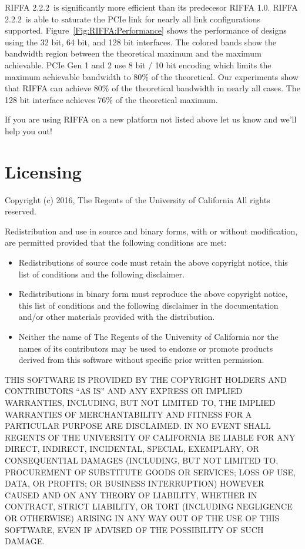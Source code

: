 \documentclass{refrep}
\newcommand{\RIFFAVer}{2.2.2}
\begin{document}
RIFFA \RIFFAVer~is significantly more efficient than its predecesor RIFFA
1.0. RIFFA \RIFFAVer~is able to saturate the PCIe link for nearly all link
configurations supported. Figure~\ref{Fig:RIFFA:Performance} shows the
performance of designs using the 32 bit, 64 bit, and 128 bit interfaces. The
colored bands show the bandwidth region between the theoretical maximum and the
maximum achievable. PCIe Gen 1 and 2 use 8 bit / 10 bit encoding which limits
the maximum achievable bandwidth to 80\% of the theoretical. Our experiments
show that RIFFA can achieve 80\% of the theoretical bandwidth in nearly all
cases. The 128 bit interface achieves 76\% of the theoretical maximum.

If you are using RIFFA on a new platform not listed above let us know and we’ll
help you out!

\section{Licensing}

Copyright (c) 2016, The Regents of the University of California All rights
reserved.

Redistribution and use in source and binary forms, with or without modification,
are permitted provided that the following conditions are met:

\begin{itemize}
    \item Redistributions of source code must retain the above copyright
      notice, this list of conditions and the following disclaimer.

    \item Redistributions in binary form must reproduce the above
      copyright notice, this list of conditions and the following
      disclaimer in the documentation and/or other materials provided
      with the distribution.

    \item Neither the name of The Regents of the University of California
      nor the names of its contributors may be used to endorse or
      promote products derived from this software without specific
      prior written permission.
\end{itemize}

THIS SOFTWARE IS PROVIDED BY THE COPYRIGHT HOLDERS AND CONTRIBUTORS ``AS IS''
AND ANY EXPRESS OR IMPLIED WARRANTIES, INCLUDING, BUT NOT LIMITED TO, THE
IMPLIED WARRANTIES OF MERCHANTABILITY AND FITNESS FOR A PARTICULAR PURPOSE ARE
DISCLAIMED. IN NO EVENT SHALL REGENTS OF THE UNIVERSITY OF CALIFORNIA BE LIABLE
FOR ANY DIRECT, INDIRECT, INCIDENTAL, SPECIAL, EXEMPLARY, OR CONSEQUENTIAL
DAMAGES (INCLUDING, BUT NOT LIMITED TO, PROCUREMENT OF SUBSTITUTE GOODS OR
SERVICES; LOSS OF USE, DATA, OR PROFITS; OR BUSINESS INTERRUPTION) HOWEVER
CAUSED AND ON ANY THEORY OF LIABILITY, WHETHER IN CONTRACT, STRICT LIABILITY, OR
TORT (INCLUDING NEGLIGENCE OR OTHERWISE) ARISING IN ANY WAY OUT OF THE USE OF
THIS SOFTWARE, EVEN IF ADVISED OF THE POSSIBILITY OF SUCH DAMAGE.
\end{document}
